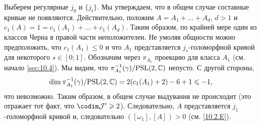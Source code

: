Выберем регулярные $j_0$ и $\{j_t\}$.
Мы утверждаем, что в общем случае составные кривые не появляются.
Действительно, положим $A = A_1 +\dots + A_d$, $d > 1$ и $c_1 (A) = 1
= c_1 (A_1) +\dots + c_1 (A_d)$. 
Таким образом, по крайней мере один из классов Черна в правой части неположителен.
Не умоляя общности можно предположить, что $c_1 (A_1) \le 0$ и что
$A_1$ представляется $j_s$-голоморфной кривой для некоторого $s \in
[0;1]$. 
Обозначим через $\pi_{A_1}$ проекцию для класса $A_1$ (см. начало \ref{sec:10.4}).
Мы видим, что $\pi_{A_1}^{-1} (\gamma)/\mathrm{PSL}(2, \mathbb{C})$ непусто.
С другой стороны, 
\[\dim \pi_{A_1}^{-1} (\gamma)/\mathrm{PSL}(2, \mathbb{C}) = 2(c_1 (A_1) + 2) - 6 + 1 \leqslant -1,\]
что невозможно.
Таким образом, в общем случае выдувания не происходит (это отражает тот факт, что $\codim \J' \ge 2$). 
Следовательно, $A$ представляется $j_1$-голоморфной кривой и, следовательно $([\omega_1], [A]) > 0$ (см. \ref{10.2.E}).
